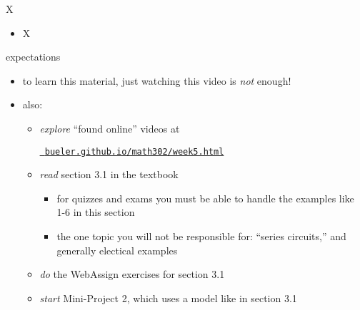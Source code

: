\documentclass{beamer}
\begin{document}
\begin{frame}{X}

\begin{itemize}
\item X
\end{itemize}
\end{frame}


\begin{frame}{expectations}

\begin{itemize}
\item to learn this material, just watching this video is \emph{not} enough!

\item also:
     \begin{itemize}
     \item \emph{explore} ``found online'' videos at

     \centerline{\href{https://bueler.github.io/math302/week5.html}{\tt \color{cyan} bueler.github.io/math302/week5.html}}
     \item \emph{read} section 3.1 in the textbook
         \begin{itemize}
         \item for quizzes and exams you must be able to handle the examples like 1-6 in this section
         \item the one topic you will not be responsible for: ``series circuits,'' and generally electical examples
         \end{itemize}
     \item \emph{do} the WebAssign exercises for section 3.1
     \item \emph{start} Mini-Project 2, which uses a model like in section 3.1
     \end{itemize}
\end{itemize}
\end{frame}
\end{document}
